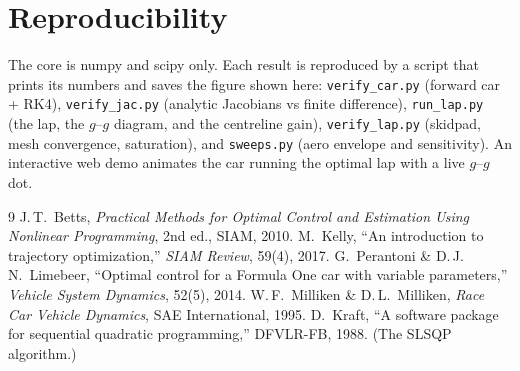 \documentclass[11pt,a4paper]{article}
\begin{document}
\section{Reproducibility}
\begin{sloppypar}
The core is numpy and scipy only. Each result is reproduced by a script that prints its numbers and
saves the figure shown here: \texttt{verify\_car.py} (forward car + RK4), \texttt{verify\_jac.py}
(analytic Jacobians vs finite difference), \texttt{run\_lap.py} (the lap, the $g$--$g$ diagram, and
the centreline gain), \texttt{verify\_lap.py} (skidpad, mesh convergence, saturation), and
\texttt{sweeps.py} (aero envelope and sensitivity). An interactive web demo animates the car
running the optimal lap with a live $g$--$g$ dot.
\end{sloppypar}

\begin{thebibliography}{9}
\small
{} J.\,T.\ Betts, \emph{Practical Methods for Optimal Control and Estimation Using
  Nonlinear Programming}, 2nd ed., SIAM, 2010.
 M.\ Kelly, ``An introduction to trajectory optimization,'' \emph{SIAM Review},
  59(4), 2017.
 G.\ Perantoni \& D.\,J.\,N.\ Limebeer, ``Optimal control for a Formula One car
  with variable parameters,'' \emph{Vehicle System Dynamics}, 52(5), 2014.
 W.\,F.\ Milliken \& D.\,L.\ Milliken, \emph{Race Car Vehicle Dynamics}, SAE
  International, 1995.
 D.\ Kraft, ``A software package for sequential quadratic programming,'' DFVLR-FB,
  1988. (The SLSQP algorithm.)
\end{thebibliography}
\end{document}
